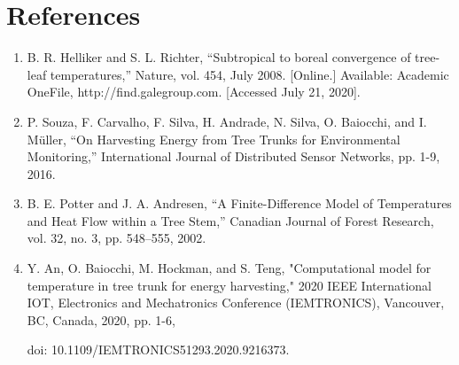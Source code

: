 \documentclass[12pt]{article}
\begin{document}
\section*{References}
\begin{enumerate}%

\item B. R. Helliker and S. L. Richter, “Subtropical to boreal convergence of tree-leaf temperatures,” Nature, vol. 454, July 2008. [Online.] Available: Academic OneFile, http://find.galegroup.com. [Accessed July 21, 2020]. \label{treeleaf}

\item P. Souza, F. Carvalho, F. Silva, H. Andrade, N. Silva, O. Baiocchi, and I. Müller, “On Harvesting Energy from Tree Trunks for Environmental Monitoring,” International Journal of Distributed Sensor Networks, pp. 1-9, 2016. \label{souza}

\item B. E. Potter and J. A. Andresen, “A Finite-Difference Model of Temperatures and Heat Flow within a Tree Stem,” Canadian Journal of Forest Research, vol. 32, no. 3, pp. 548–555, 2002.\label{potter_andresen}

\item Y. An, O. Baiocchi, M. Hockman, and S. Teng, "Computational model for temperature in tree trunk for energy harvesting," 2020 IEEE International IOT, Electronics and Mechatronics Conference (IEMTRONICS), Vancouver, BC, Canada, 2020, pp. 1-6, 

doi: 10.1109/IEMTRONICS51293.2020.9216373.\label{1Dtree}






\end{enumerate}
\end{document}
